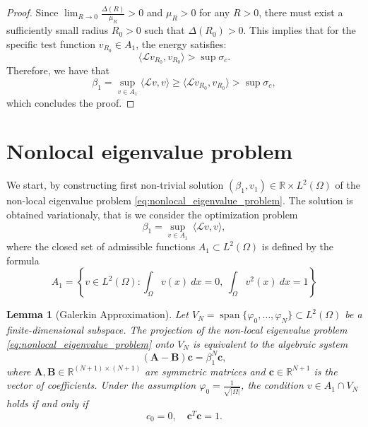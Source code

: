 \documentclass[11pt, a4paper]{article}
\theoremstyle{break}
\theoremstyle{break}
\theoremstyle{break}
\theoremstyle{break}
\theoremstyle{break}
\newtheorem{lem}{Lemma}[section]
\theoremstyle{break}
\theoremstyle{break}
\theoremstyle{break}
\theoremstyle{break}
\begin{document}
\begin{proof}
Since $\lim_{R \to 0} \frac{\Delta(R)}{\mu_R} > 0$ and $\mu_R > 0$ for any $R > 0$, there must exist a sufficiently small radius $R_0 > 0$ such that $\Delta(R_0) > 0$. 
This implies that for the specific test function $v_{R_0} \in A_1$, the energy satisfies:
\begin{equation}
    \langle \mathcal{L}v_{R_0}, v_{R_0} \rangle > \sup \sigma_c.
\end{equation}
Therefore, we have that
\begin{equation}
    \beta_1 = \sup_{v \in A_1} \langle \mathcal{L}v, v \rangle \geq \langle \mathcal{L}v_{R_0}, v_{R_0} \rangle > \sup \sigma_c,
\end{equation}
which concludes the proof.
\end{proof}

\section{Nonlocal eigenvalue problem}

We start, by constructing first non-trivial solution $(\beta_1, v_1) \in \mathbb{R} \times L^2(\Omega)$ of the non-local eigenvalue problem \eqref{eq:nonlocal_eigenvalue_problem}. The solution is obtained variationaly, that is we consider the optimization problem
\begin{equation}
    \label{eq:eigenvalue_problem_1}
    \beta_1 = \sup_{v \in A_1} \: \langle \mathcal L v, v \rangle,
\end{equation}
where the closed set of admissible functions $A_1 \subset L^2(\Omega)$ is defined by the formula
\begin{equation}
    \label{eq:A_set_Def}
    A_1 = \left\{ v \in L^2(\Omega) : \int_\Omega v(x) \:dx = 0, \: \int_\Omega v^2(x) \:dx = 1 \right\}
\end{equation}

\begin{lem}[Galerkin Approximation]
\label{lem:galerkin_approximation}
Let $V_N = \operatorname{span}\{\varphi_0, \dots, \varphi_N\} \subset L^2(\Omega)$ be a finite-dimensional subspace. The projection of the non-local eigenvalue problem \eqref{eq:nonlocal_eigenvalue_problem} onto $V_N$ is equivalent to the algebraic system 
\begin{equation}
    \label{eq:matrix_system_lemma}
    (\mathbf{A} - \mathbf{B})\mathbf{c} = \beta_1^N \mathbf{c},
\end{equation}
    where $\mathbf{A}, \mathbf{B} \in \mathbb{R}^{(N+1) \times (N+1)}$ are symmetric matrices and $\mathbf{c} \in \mathbb{R}^{N+1}$ is the vector of coefficients. Under the assumption $\varphi_0 = \frac{1}{\sqrt{|\Omega|}}$, the condition $v \in A_1 \cap V_N$ holds if and only if
    \begin{equation}
        \label{eq:system_constraint_lemma}
        c_0 = 0, \quad \mathbf{c}^T\mathbf{c} = 1.
    \end{equation}
\end{lem}
\end{document}
